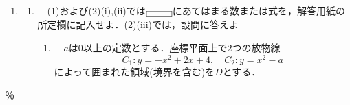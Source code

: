 \documentclass[a4paper]{ltjsarticle}
\begin{document}




\noindent
\begin{enumerate}
\item[]
        \begin{enumerate}
\item[]　(1)および(2)(i),(ii)では$\fbox{\qquad}$にあてはまる数または式を，解答用紙の所定欄に記入せよ．(2)(iii)では，設問に答えよ
\begin{enumerate}
\item[(1)]　$a$は$0$以上の定数とする．座標平面上で$2$つの放物線
\[C_1:y=-x^2+2x+4,\quad C_2:y=x^2-a\]
によって囲まれた領域(境界を含む)を$D$とする．
\end{enumerate}
\end{enumerate}
\end{enumerate}\vspace{10truemm}
％
\end{document}
